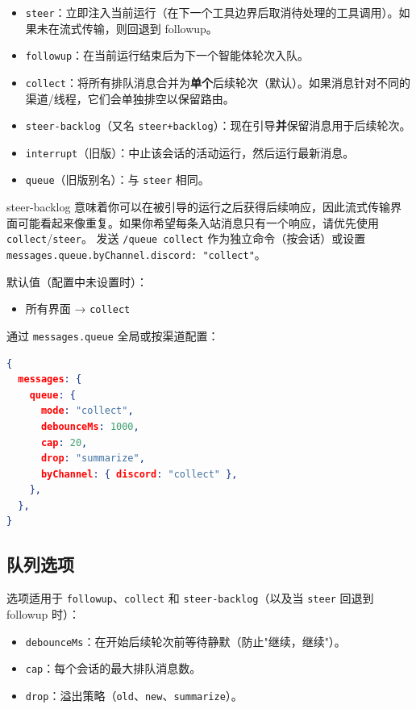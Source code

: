 \begin{itemize}
  \item \texttt{steer}：立即注入当前运行（在下一个工具边界后取消待处理的工具调用）。如果未在流式传输，则回退到 followup。
  \item \texttt{followup}：在当前运行结束后为下一个智能体轮次入队。
  \item \texttt{collect}：将所有排队消息合并为\textbf{单个}后续轮次（默认）。如果消息针对不同的渠道/线程，它们会单独排空以保留路由。
  \item \texttt{steer-backlog}（又名 \texttt{steer+backlog}）：现在引导\textbf{并}保留消息用于后续轮次。
  \item \texttt{interrupt}（旧版）：中止该会话的活动运行，然后运行最新消息。
  \item \texttt{queue}（旧版别名）：与 \texttt{steer} 相同。
\end{itemize}


steer-backlog 意味着你可以在被引导的运行之后获得后续响应，因此流式传输界面可能看起来像重复。如果你希望每条入站消息只有一个响应，请优先使用 \texttt{collect}/\texttt{steer}。
发送 \texttt{/queue collect} 作为独立命令（按会话）或设置 \texttt{messages.queue.byChannel.discord: "collect"}。

默认值（配置中未设置时）：

\begin{itemize}
  \item 所有界面 → \texttt{collect}
\end{itemize}


通过 \texttt{messages.queue} 全局或按渠道配置：

\begin{lstlisting}[language=json]
{
  messages: {
    queue: {
      mode: "collect",
      debounceMs: 1000,
      cap: 20,
      drop: "summarize",
      byChannel: { discord: "collect" },
    },
  },
}
\end{lstlisting}


\subsection{队列选项}


选项适用于 \texttt{followup}、\texttt{collect} 和 \texttt{steer-backlog}（以及当 \texttt{steer} 回退到 followup 时）：

\begin{itemize}
  \item \texttt{debounceMs}：在开始后续轮次前等待静默（防止"继续，继续"）。
  \item \texttt{cap}：每个会话的最大排队消息数。
  \item \texttt{drop}：溢出策略（\texttt{old}、\texttt{new}、\texttt{summarize}）。
\end{itemize}


